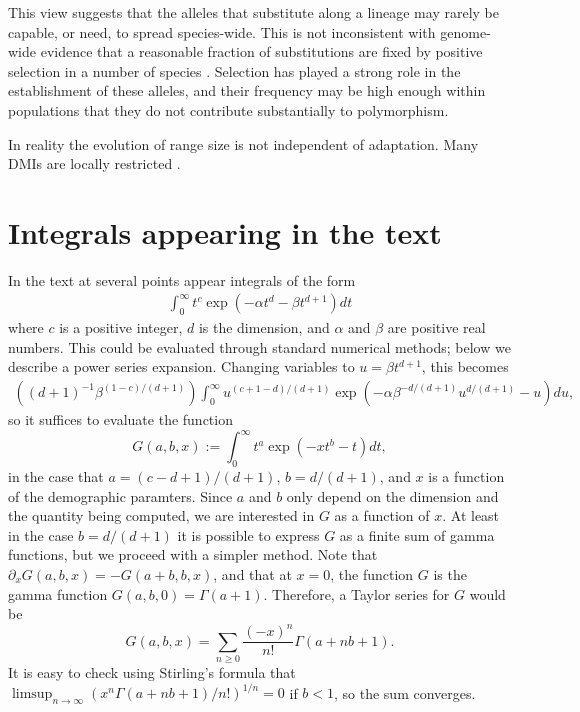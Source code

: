 \documentclass{article}
\begin{document}
This view suggests that the alleles that substitute along a lineage
may rarely be capable, or need, to spread species-wide. This is not
inconsistent with genome-wide evidence that a reasonable fraction of 
substitutions are fixed by positive selection in a number of species
\citep[most notably Drosophila][]{}. Selection has played a strong
role in the establishment of these alleles, and their frequency may be
high enough within populations that they do not contribute
substantially to polymorphism.

In reality the evolution of range size is not independent of
adaptation. Many DMIs are locally restricted \citep{Cutter:12}.





\appendix

\section{Integrals appearing in the text}
    \label{apx:integrals}

In the text at several points appear integrals of the form
\begin{align}
  \int_0^\infty t^c \exp \left( - \alpha t^d - \beta t^{d+1} \right) dt 
\end{align}
where $c$ is a positive integer, $d$ is the dimension, and $\alpha$ and $\beta$ are positive real numbers.
This could be evaluated through standard numerical methods; below we describe a power series expansion.
Changing variables to $u = \beta t^{d+1}$, this becomes
\begin{align}
    \left( (d+1)^{-1} \beta^{ (1-c)/(d+1) } \right) \int_0^\infty u^{(c+1-d)/(d+1)} \exp\left( - \alpha \beta^{-d/(d+1)} u^{d/(d+1)} - u \right) du ,
\end{align}
so it suffices to evaluate the function
\begin{equation}
    G(a,b,x) := \int_0^\infty  t^a \exp\left( -x t^b - t \right) dt ,
\end{equation}
in the case that $a=(c-d+1)/(d+1)$, $b=d/(d+1)$, and $x$ is a function of the demographic paramters.
Since $a$ and $b$ only depend on the dimension and the quantity being computed,
we are interested in $G$ as a function of $x$.
At least in the case $b=d/(d+1)$ it is possible to express $G$ as a finite sum of gamma functions,
but we proceed with a simpler method.
Note that $\partial_x G(a,b,x) = -G(a+b,b,x)$,
and that at $x=0$, the function $G$ is the gamma function $G(a,b,0) = \Gamma(a+1)$.
Therefore, a Taylor series for $G$ would be
\[
    G(a,b,x) = \sum_{n \ge 0} \frac{(-x)^n}{n!} \Gamma(a+nb+1) .
\]
It is easy to check using Stirling's formula that $\limsup_{n \to \infty} ( x^n \Gamma(a+nb+1)/n! )^{1/n} = 0$
if $b<1$, so the sum converges.
\end{document}
